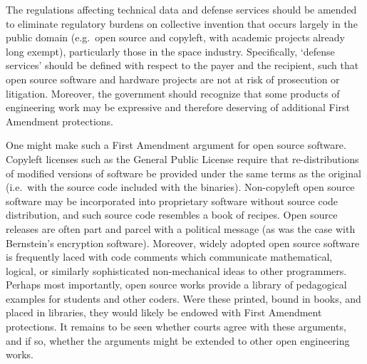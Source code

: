 \documentclass[preprint,twocolumn,5p]{elsarticle}
\begin{document}
The regulations affecting technical data and defense services should be amended to eliminate regulatory burdens on collective invention that occurs largely in the public domain (e.g.\ open source and copyleft, with academic projects already long exempt), particularly those in the space industry. Specifically, `defense services' should be defined with respect to the payer and the recipient, such that open source software and hardware projects are not at risk of prosecution or litigation. Moreover, the government should recognize that some products of engineering work may be expressive and therefore deserving of additional First Amendment protections.

One might make such a First Amendment argument for open source software. Copyleft licenses such as the General Public License require that re-distributions of modified versions of software be provided under the same terms as the original (i.e.\ with the source code included with the binaries). Non-copyleft open source software may be incorporated into proprietary software without source code distribution, and such source code resembles a book of recipes. Open source releases are often part and parcel with a political message (as was the case with Bernstein's encryption software). Moreover, widely adopted open source software is frequently laced with code comments which communicate mathematical, logical, or similarly sophisticated non-mechanical ideas to other programmers. Perhaps most importantly, open source works provide a library of pedagogical examples for students and other coders. Were these printed, bound in books, and placed in libraries, they would likely be endowed with First Amendment protections. It remains to be seen whether courts agree with these arguments, and if so, whether the arguments might be extended to other open engineering works.

\end{document}
